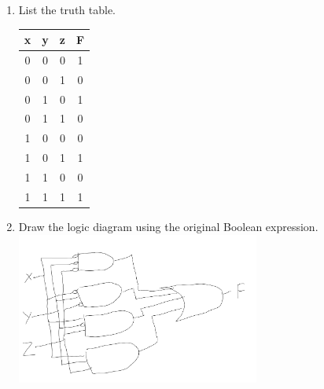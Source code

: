 \documentclass[12pt,letterpaper,titlepage]{report}
\begin{document}
\begin{enumerate}[label=\alph*)]
	\item List the truth table.\\
	\def\arraystretch{1.5} 
	\begin{tabular}{|c c c|c|}\hline
	x & y & z & F \\\hline
	0 & 0 & 0 & 1 \\\hline
	0 & 0 & 1 & 0 \\\hline
	0 & 1 & 0 & 1 \\\hline
	0 & 1 & 1 & 0 \\\hline
	1 & 0 & 0 & 0 \\\hline
	1 & 0 & 1 & 1 \\\hline
	1 & 1 & 0 & 0 \\\hline
	1 & 1 & 1 & 1 \\\hline
	\end{tabular}

	\item Draw the logic diagram using the original Boolean expression. \\
	\includegraphics[width=8cm]{hw3p4b}


\end{enumerate}
\end{document}
